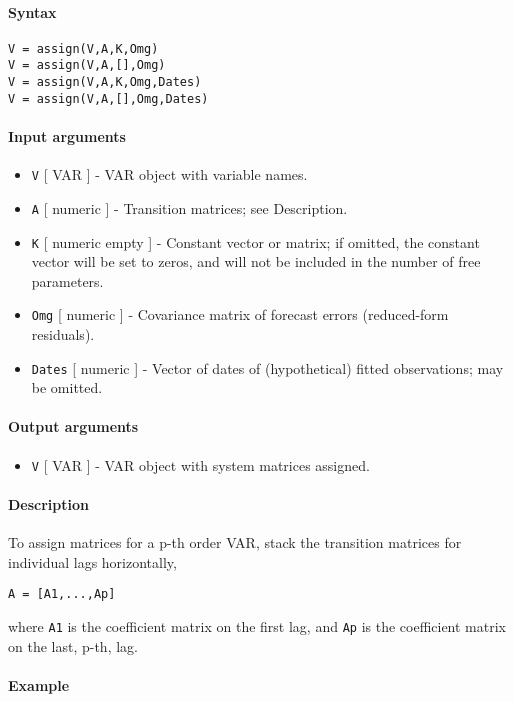 


	\paragraph{Syntax}

\begin{verbatim}
V = assign(V,A,K,Omg)
V = assign(V,A,[],Omg)
V = assign(V,A,K,Omg,Dates)
V = assign(V,A,[],Omg,Dates)
\end{verbatim}

\paragraph{Input arguments}

\begin{itemize}
\item
  \texttt{V} {[} VAR {]} - VAR object with variable names.
\item
  \texttt{A} {[} numeric {]} - Transition matrices; see Description.
\item
  \texttt{K} {[} numeric \textbar{} empty {]} - Constant vector or
  matrix; if omitted, the constant vector will be set to zeros, and will
  not be included in the number of free parameters.
\item
  \texttt{Omg} {[} numeric {]} - Covariance matrix of forecast errors
  (reduced-form residuals).
\item
  \texttt{Dates} {[} numeric {]} - Vector of dates of (hypothetical)
  fitted observations; may be omitted.
\end{itemize}

\paragraph{Output arguments}

\begin{itemize}
\itemsep1pt\parskip0pt
\item
  \texttt{V} {[} VAR {]} - VAR object with system matrices assigned.
\end{itemize}

\paragraph{Description}

To assign matrices for a p-th order VAR, stack the transition matrices
for individual lags horizontally,

\begin{verbatim}
A = [A1,...,Ap]
\end{verbatim}

where \texttt{A1} is the coefficient matrix on the first lag, and
\texttt{Ap} is the coefficient matrix on the last, p-th, lag.

\paragraph{Example}


